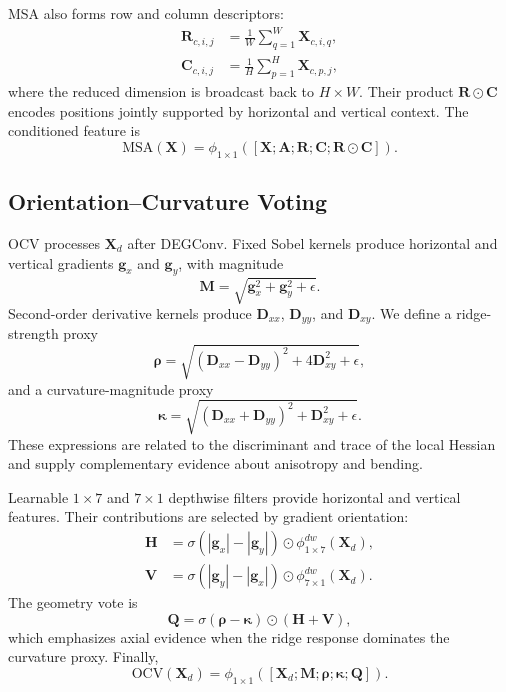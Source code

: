 \documentclass[preprint,12pt]{elsarticle}
\begin{document}
MSA also forms row and column descriptors:
\begin{align}
\mathbf{R}_{c,i,j} &= \frac{1}{W}\sum_{q=1}^{W}\mathbf{X}_{c,i,q}, \\
\mathbf{C}_{c,i,j} &= \frac{1}{H}\sum_{p=1}^{H}\mathbf{X}_{c,p,j},
\end{align}
where the reduced dimension is broadcast back to $H\times W$. Their product $\mathbf{R}\odot\mathbf{C}$ encodes positions jointly supported by horizontal and vertical context. The conditioned feature is
\begin{equation}
\mathrm{MSA}(\mathbf{X})=\phi_{1\times1}
([\mathbf{X};\mathbf{A};\mathbf{R};\mathbf{C};\mathbf{R}\odot\mathbf{C}]).
\label{eq:msa}
\end{equation}

\subsection{Orientation--Curvature Voting}
\label{sec:ocv}

OCV processes $\mathbf{X}_d$ after DEGConv. Fixed Sobel kernels produce horizontal and vertical gradients $\mathbf{g}_x$ and $\mathbf{g}_y$, with magnitude
\begin{equation}
\mathbf{M}=\sqrt{\mathbf{g}_x^2+\mathbf{g}_y^2+\epsilon}.
\end{equation}
Second-order derivative kernels produce $\mathbf{D}_{xx}$, $\mathbf{D}_{yy}$, and $\mathbf{D}_{xy}$. We define a ridge-strength proxy
\begin{equation}
\boldsymbol{\rho}=\sqrt{(\mathbf{D}_{xx}-\mathbf{D}_{yy})^2+4\mathbf{D}_{xy}^{2}+\epsilon},
\label{eq:ridge}
\end{equation}
and a curvature-magnitude proxy
\begin{equation}
\boldsymbol{\kappa}=\sqrt{(\mathbf{D}_{xx}+\mathbf{D}_{yy})^2+\mathbf{D}_{xy}^{2}+\epsilon}.
\label{eq:curvature}
\end{equation}
These expressions are related to the discriminant and trace of the local Hessian and supply complementary evidence about anisotropy and bending.

Learnable $1\times7$ and $7\times1$ depthwise filters provide horizontal and vertical features. Their contributions are selected by gradient orientation:
\begin{align}
\mathbf{H} &= \sigma(|\mathbf{g}_x|-|\mathbf{g}_y|)\odot
\phi^{dw}_{1\times7}(\mathbf{X}_{d}), \\
\mathbf{V} &= \sigma(|\mathbf{g}_y|-|\mathbf{g}_x|)\odot
\phi^{dw}_{7\times1}(\mathbf{X}_{d}).
\end{align}
The geometry vote is
\begin{equation}
\mathbf{Q}=\sigma(\boldsymbol{\rho}-\boldsymbol{\kappa})\odot(\mathbf{H}+\mathbf{V}),
\end{equation}
which emphasizes axial evidence when the ridge response dominates the curvature proxy. Finally,
\begin{equation}
\mathrm{OCV}(\mathbf{X}_{d})=\phi_{1\times1}
([\mathbf{X}_{d};\mathbf{M};\boldsymbol{\rho};\boldsymbol{\kappa};\mathbf{Q}]).
\label{eq:ocv}
\end{equation}
\end{document}
